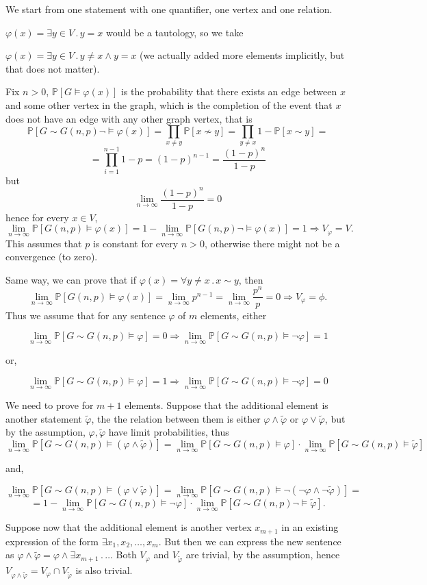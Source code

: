 \documentclass{article}
\begin{document}
We start from one statement with one quantifier, one vertex and one relation.

$\varphi(x)=\exists{y\in{V}}\,.\,y={x}$ would be a tautology, so we take 

$\varphi(x)=\exists{y\in{V}}\,.\,y\neq{x}\land{y={x}}$ (we actually added more elements implicitly, but that does not matter).

Fix $n>0$, $\mathbb{P}[G\vDash\varphi(x)]$ is the probability that there exists an edge between $x$ and some other vertex in the graph, which is the completion of the event that $x$ does not have an edge with any other graph vertex, that is \[\mathbb{P}[G\sim{G(n,p)}\neg\vDash\varphi(x)]=\prod_{x\neq{y}}\mathbb{P}[x\nsim{y}]=\prod_{y\neq{x}}1-\mathbb{P}[x\sim{y}]=\]\[=\prod_{i=1}^{n-1}1-p=(1-p)^{n-1}=\frac{(1-p)^n}{1-p}\]
but \[\lim_{n\rightarrow\infty}\frac{(1-p)^n}{1-p}=0\]
hence for every $x\in{V}$, \[\lim_{n\rightarrow\infty}\mathbb{P}[G(n,p)\vDash\varphi(x)]=1-\lim_{n\rightarrow\infty}\mathbb{P}[G(n,p)\neg\vDash\varphi(x)]=1\Rightarrow{V_\varphi={V}}.\]
This assumes that $p$ is constant for every $n>0$, otherwise there might not be a convergence (to zero).

Same way, we can prove that if $\varphi(x)=\forall{y\neq{x}}\,.\,x\sim{y}$, then \[\lim_{n\rightarrow\infty}\mathbb{P}[G(n,p)\vDash\varphi(x)]=\lim_{n\rightarrow\infty}p^{n-1}=\lim_{n\rightarrow\infty}\frac{p^n}{p}=0\Rightarrow{V_\varphi=\phi}.\]
Thus we assume that for any sentence $\varphi$ of $m$ elements, either

\[\lim_{n\rightarrow\infty}\mathbb{P}[G\sim{G(n,p)\vDash\varphi}]=0\Rightarrow\lim_{n\rightarrow\infty}\mathbb{P}[G\sim{G(n,p)\vDash\neg\varphi}]=1\]

or,

\[\lim_{n\rightarrow\infty}\mathbb{P}[G\sim{G(n,p)\vDash\varphi}]=1\Rightarrow\lim_{n\rightarrow\infty}\mathbb{P}[G\sim{G(n,p)\vDash\neg\varphi}]=0\]

We need to prove for $m+1$ elements. Suppose that the additional element is another statement $\tilde\varphi$, the the relation between them is either $\varphi\land\tilde\varphi$ or $\varphi\lor\tilde\varphi$, but by the assumption, $\varphi,\tilde\varphi$ have limit probabilities, thus \[\lim_{n\rightarrow\infty
}\mathbb{P}[G\sim{G(n,p)}\vDash(\varphi\land\tilde\varphi)]=\lim_{n\rightarrow\infty
}\mathbb{P}[G\sim{G(n,p)}\vDash\varphi]\cdot\lim_{n\rightarrow\infty
}\mathbb{P}[G\sim{G(n,p)}\vDash\tilde\varphi]\]

and,

\[\lim_{n\rightarrow\infty
}\mathbb{P}[G\sim{G(n,p)}\vDash(\varphi\lor\tilde\varphi)]=\lim_{n\rightarrow\infty
}\mathbb{P}[G\sim{G(n,p)}\vDash\neg(\neg\varphi\land\neg\tilde\varphi)]=\]\[=1-\lim_{n\rightarrow\infty
}\mathbb{P}[G\sim{G(n,p)}\vDash\neg\varphi]\cdot\lim_{n\rightarrow\infty
}\mathbb{P}[G\sim{G(n,p)}\neg\vDash\tilde\varphi].\]

Suppose now that the additional element is another vertex $x_{m+1}$ in an existing expression of the form $\exists{x_1,x_2,\dots,x_m}$. But then we can express the new sentence as $\varphi\land\tilde\varphi=\varphi\land\exists{x_{m+1}}\,.\,\dots$
Both $V_\varphi$ and $V_{\tilde\varphi}$ are trivial, by the assumption, hence $V_{\varphi\land\tilde\varphi}=V_\varphi\cap{V_{\tilde\varphi}}$ is also trivial.
\end{document}
